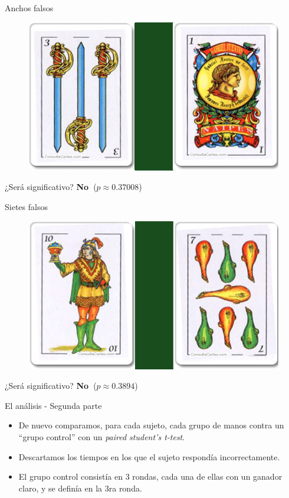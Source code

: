 \documentclass{beamer}
\begin{document}
\begin{frame}{Anchos falsos}
\begin{figure}
   \includegraphics[width=0.8\linewidth]{examples_img/rondas_6.png}
\end{figure}
\begin{center}¿Será significativo?
\pause
\textbf{No\ }($p \approx 0.37008$)
\end{center}
\end{frame}

\begin{frame}{Sietes falsos}
\begin{figure}
   \includegraphics[width=0.8\linewidth]{examples_img/rondas_7.png}
\end{figure}
\begin{center}¿Será significativo?
\pause
\textbf{No\ }($p \approx 0.3894$)
\end{center}
\end{frame}

\begin{frame}{El análisis - Segunda parte}
\begin{itemize}
\item De nuevo comparamos, para cada sujeto, cada grupo de manos contra un ``grupo control'' con un \textit{paired student's t-test}.
\item Descartamos los tiempos en los que el sujeto respondía incorrectamente.
\item El grupo control consistía en 3 rondas, cada una de ellas con un ganador claro, y se definía en la 3ra ronda.
\end{itemize}
\end{frame}
\end{document}
